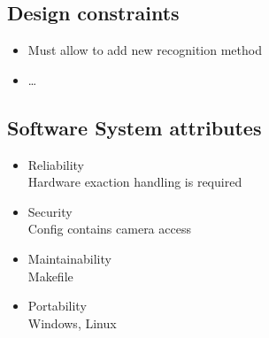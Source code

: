 \documentclass[12pt, a4paper, titlepage]{article}
\begin{document}
		\subsection{Design constraints}
			\begin{itemize}
				\item Must allow to add new recognition method
				\item \ldots
			\end{itemize}
			
		\subsection{Software System attributes}
			\begin{itemize}
				\item Reliability \\ Hardware exaction handling is required
				\item Security \\ Config contains camera access
				\item Maintainability \\ Makefile
				\item Portability \\ Windows, Linux
			\end{itemize}
\end{document}
